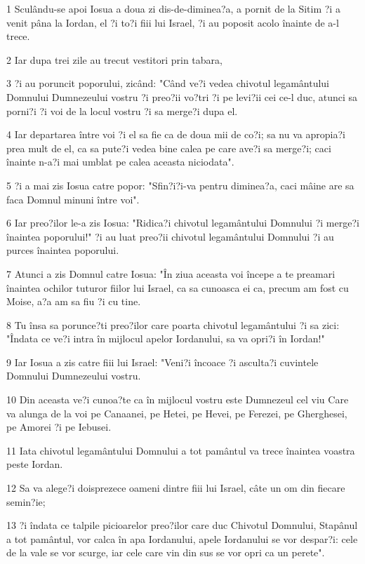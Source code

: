 \par 1 Sculându-se apoi Iosua a doua zi dis-de-diminea?a, a pornit de la Sitim ?i a venit pâna la Iordan, el ?i to?i fiii lui Israel, ?i au poposit acolo înainte de a-l trece.
\par 2 Iar dupa trei zile au trecut vestitori prin tabara,
\par 3 ?i au poruncit poporului, zicând: "Când ve?i vedea chivotul legamântului Domnului Dumnezeului vostru ?i preo?ii vo?tri ?i pe levi?ii cei ce-l duc, atunci sa porni?i ?i voi de la locul vostru ?i sa merge?i dupa el.
\par 4 Iar departarea între voi ?i el sa fie ca de doua mii de co?i; sa nu va apropia?i prea mult de el, ca sa pute?i vedea bine calea pe care ave?i sa merge?i; caci înainte n-a?i mai umblat pe calea aceasta niciodata".
\par 5 ?i a mai zis Iosua catre popor: "Sfin?i?i-va pentru diminea?a, caci mâine are sa faca Domnul minuni între voi".
\par 6 Iar preo?ilor le-a zis Iosua: "Ridica?i chivotul legamântului Domnului ?i merge?i înaintea poporului!" ?i au luat preo?ii chivotul legamântului Domnului ?i au purces înaintea poporului.
\par 7 Atunci a zis Domnul catre Iosua: "În ziua aceasta voi începe a te preamari înaintea ochilor tuturor fiilor lui Israel, ca sa cunoasca ei ca, precum am fost cu Moise, a?a am sa fiu ?i cu tine.
\par 8 Tu însa sa porunce?ti preo?ilor care poarta chivotul legamântului ?i sa zici: "Îndata ce ve?i intra în mijlocul apelor Iordanului, sa va opri?i în Iordan!"
\par 9 Iar Iosua a zis catre fiii lui Israel: "Veni?i încoace ?i asculta?i cuvintele Domnului Dumnezeului vostru.
\par 10 Din aceasta ve?i cunoa?te ca în mijlocul vostru este Dumnezeul cel viu Care va alunga de la voi pe Canaanei, pe Hetei, pe Hevei, pe Ferezei, pe Gherghesei, pe Amorei ?i pe Iebusei.
\par 11 Iata chivotul legamântului Domnului a tot pamântul va trece înaintea voastra peste Iordan.
\par 12 Sa va alege?i doisprezece oameni dintre fiii lui Israel, câte un om din fiecare semin?ie;
\par 13 ?i îndata ce talpile picioarelor preo?ilor care duc Chivotul Domnului, Stapânul a tot pamântul, vor calca în apa Iordanului, apele Iordanului se vor despar?i: cele de la vale se vor scurge, iar cele care vin din sus se vor opri ca un perete".
